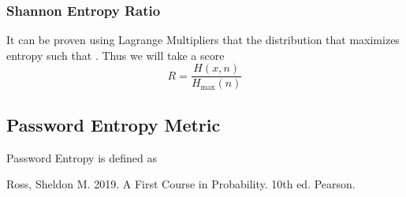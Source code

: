 \documentclass{article}
\begin{document}
\subsubsection{Shannon Entropy Ratio}
It can be proven using Lagrange Multipliers that the distribution that maximizes entropy such that .
Thus we will take a score 
\[
R = \frac{H(x, n)}{H_{\text{max}}(n)}
\]

\subsection{Password Entropy Metric}
Password Entropy is defined as 
\[

\]

\newpage
\begin{thebibliography}{00}
 Ross, Sheldon M. 2019. A First Course in Probability. 10th ed. Pearson.
\end{thebibliography}
\end{document}
